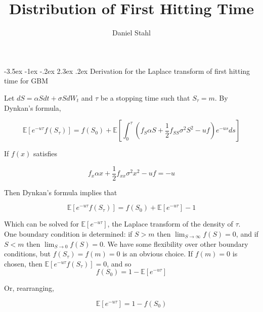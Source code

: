 \documentclass[12pt]{article}
\author{Daniel Stahl}
\title{Distribution of First Hitting Time}
\makeatletter
\renewcommand\section{\@startsection{section}{1}{\z@}%
                                  {-3.5ex \@plus -1ex \@minus -.2ex}%
                                  {2.3ex \@plus.2ex}%
                                  {\normalfont\large\bfseries}}
\makeatother
\begin{document}

\setlength{\parindent}{0pt}












\maketitle
\section{Derivation for the Laplace transform of first hitting time for GBM}

Let \(dS=\alpha S dt+\sigma S dW_t\) and \(\tau\) be a stopping time such that \(S_\tau=m\).  By Dynkan's formula, 

\[\mathbb{E} [e^{-u\tau}f(S_\tau)]=f(S_0)+\mathbb{E}\left[ \int_0  ^ \tau \left(f_{S} \alpha S + \frac{1}{2} f_{SS} \sigma^2 S^2-uf\right) e^{-us} ds\right]\]

If \(f(x)\) satisfies 

\begin{equation}\label{ode}f_x \alpha x+\frac{1}{2} f_{xx} \sigma^2 x^2 -uf=-u\end{equation}

Then Dynkan's formula implies that 

\[\mathbb{E}[e^{-u\tau}f(S_\tau)]=f(S_0)+\mathbb{E}\left[e^{-u \tau}\right]-1\]

Which can be solved for \(\mathbb{E}\left[e^{-u \tau}\right]\), the Laplace transform of the density of \(\tau\).
\\

One boundary condition is determined: if \(S>m\) then \(\lim_{S \to \infty} f(S)=0\), and if \(S<m\) then \(\lim_{S \to 0} f(S)=0\).  We have some flexibility over other boundary conditions, but \(f(S_\tau)=f(m)=0\) is an obvious choice.  If \(f(m)=0\) is chosen, then \(\mathbb{E}[e^{-u\tau}f(S_\tau)]=0\), and so 
\[f(S_0)=1-\mathbb{E}\left[e^{-u \tau}\right]\]

Or, rearranging,

\begin{equation} \label{laplace} \mathbb{E}\left[e^{-u \tau}\right]=1-f(S_0)\end{equation}
\end{document}
